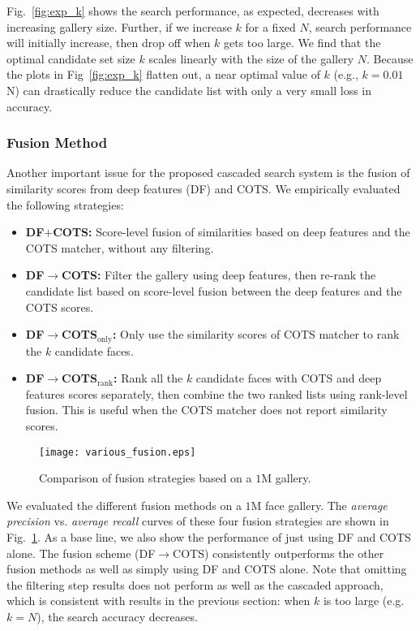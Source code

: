 \documentclass[10pt,journal,compsoc]{IEEEtran}
\begin{document}
Fig.~\ref{fig:exp_k} shows the search performance, as expected, decreases with increasing gallery size. Further, if we increase $k$ for a fixed $N$, search performance will initially increase, then drop off when $k$ gets too large.  We find that the optimal candidate set size $k$ scales linearly with the size of the gallery $N$. Because the plots in Fig~\ref{fig:exp_k} flatten out, a near optimal value of $k$ (e.g., $k=0.01$N) can drastically reduce the candidate list with only a very small loss in accuracy.

\subsubsection{Fusion Method}
Another important issue for the proposed cascaded search system is the fusion of similarity scores from deep features (DF) and COTS. We empirically evaluated the following strategies:
\begin{itemize}
  \item {\bf DF$+$COTS:} Score-level fusion of similarities based on deep features and the COTS matcher, without any filtering.
  \item	{\bf DF$\rightarrow$COTS:} Filter the gallery using deep features, then re-rank the candidate list based on score-level fusion between the deep features and the COTS scores.
  \item {\bf DF$\rightarrow$COTS$_\mathrm{only}$:} Only use the similarity scores of COTS matcher to rank the $k$ candidate faces.
  \item {\bf DF$\rightarrow$COTS$_\mathrm{rank}$:} Rank all the $k$ candidate faces with COTS and deep features scores separately, then combine the two ranked lists using rank-level fusion. This is useful when the COTS matcher does not report similarity scores.
\end{itemize}
\begin{figure}
\centering
  \texttt{[image: various\_fusion.eps]}\\
  \caption{Comparison of fusion strategies based on a $1$M gallery. }\label{fig:fusion}
\end{figure}
We evaluated the different fusion methods on a $1$M face gallery. The \emph{average precision} vs. \emph{average recall} curves of these four fusion strategies are shown in Fig.~\ref{fig:fusion}. As a base line, we also show the performance of just using DF and COTS alone. The fusion scheme (DF$\rightarrow$COTS) consistently outperforms the other fusion methods as well as simply using DF and COTS alone. Note that omitting the filtering step results does not perform as well as the cascaded approach, which is consistent with results in the previous section: when $k$ is too large (e.g. $k=N$), the search accuracy decreases.
\end{document}
